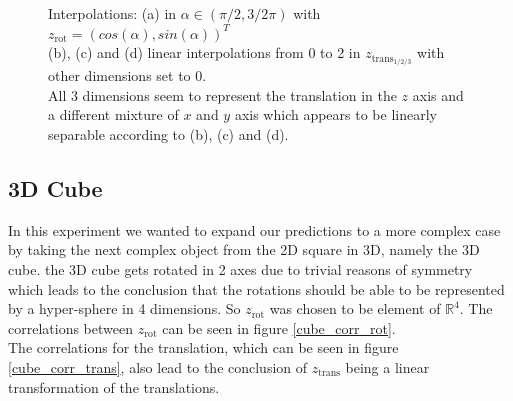 \documentclass[10pt,a4paper]{article}
\newcommand{\rot}{\ensuremath{\text{rot}\xspace}}
\newcommand{\trans}{\ensuremath{\text{trans}\xspace}}
\begin{document}
\begin{figure}[!ht]
\begin{subfigure}{0.49\textwidth}
	\caption{}
	\label{fig1:subim4}
\end{subfigure}
\caption{Interpolations: (a) in $\alpha \in (\pi /2, 3/2 \pi)$ with $z_{\rot}= (cos(\alpha), sin(\alpha))^T$\\
(b), (c) and (d) linear interpolations from 0 to 2 in $z_{\trans_{1/2/3}}$ with other dimensions set to 0.\\
All 3 dimensions seem to represent the translation in the $z$ axis and a different mixture of $x$ and $y$ axis which appears to be linearly separable according to (b), (c) and (d).} \label{square_ipol}
\end{figure}
\newpage
\subsection{3D Cube}\label{Cube}
In this experiment we wanted to expand our predictions to a more complex case by taking the next complex object from the 2D square in 3D, namely the 3D cube. the 3D cube gets rotated in 2 axes due to trivial reasons of symmetry which leads to the conclusion that the rotations should be able to be represented by a hyper-sphere in 4 dimensions. So $z_{\rot}$ was chosen to be element of $\mathbb{R}^4$. The correlations between $z_{\rot}$ can be seen in figure \ref{cube_corr_rot}. \\
The correlations for the translation, which can be seen in figure \ref{cube_corr_trans}, also lead to the conclusion of $z_{\trans}$ being a linear transformation of the translations. 
\end{document}

